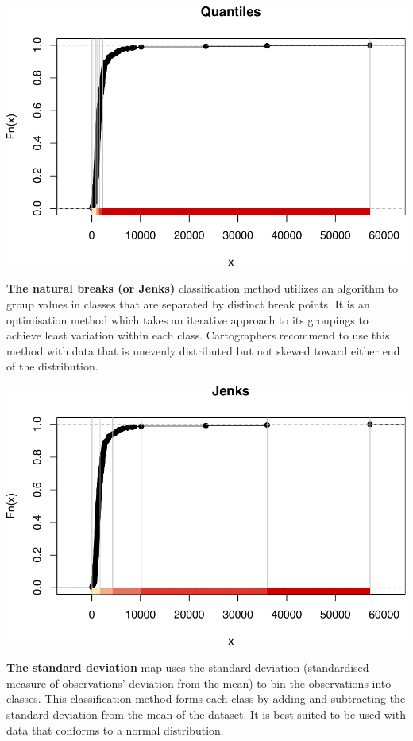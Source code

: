 \documentclass[
  krantz2]{krantz}
\begin{document}
\includegraphics{crime_mapping_files/figure-latex/unnamed-chunk-91-1.pdf}

\textbf{The natural breaks (or Jenks)} classification method utilizes an algorithm to group values in classes that are separated by distinct break points. It is an optimisation method which takes an iterative approach to its groupings to achieve least variation within each class. Cartographers recommend to use this method with data that is unevenly distributed but not skewed toward either end of the distribution.

\includegraphics{crime_mapping_files/figure-latex/unnamed-chunk-92-1.pdf}

\textbf{The standard deviation} map uses the standard deviation (standardised measure of observations' deviation from the mean) to bin the observations into classes. This classification method forms each class by adding and subtracting the standard deviation from the mean of the dataset. It is best suited to be used with data that conforms to a normal distribution.
\end{document}
